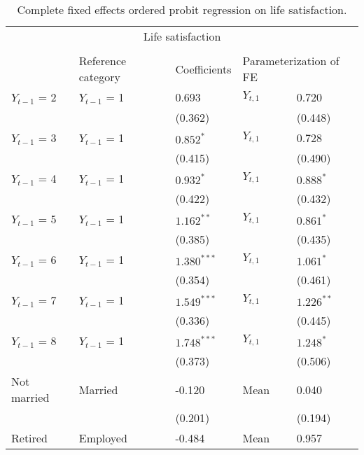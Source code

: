 \documentclass[12pt]{article}
\begin{document}
\begin{table}[h!]
\centering
\footnotesize
\caption*{Complete fixed effects ordered probit regression on life satisfaction. }
\label{table1}
\begin{tabular}{ll l l l}
\hline
\multicolumn{5}{c}{Life satisfaction} \\\\
 & \multicolumn{1}{l}{Reference category} & \multicolumn{1}{l}{Coefficients} & \multicolumn{2}{l}{Parameterization of FE}\\\hline\hline
$Y_{t-1}$ = 2               & $Y_{t-1}$ = 1 &  0.693         & $Y_{t,1}$ &  0.720\\
                            &               &  (0.362)       &           &  (0.448)\\
$Y_{t-1}$ = 3               & $Y_{t-1}$ = 1 &  $0.852^{*}$   & $Y_{t,1}$ &  0.728\\
                            &               &  (0.415)       &           &  (0.490)\\
$Y_{t-1}$ = 4               & $Y_{t-1}$ = 1 &  $0.932^{*}$   & $Y_{t,1}$ &  $0.888^{*}$\\
                            &               &  (0.422)       &           &  (0.432)\\
$Y_{t-1}$ = 5               & $Y_{t-1}$ = 1 &  $1.162^{**}$  & $Y_{t,1}$ &  $0.861^{*}$\\
                            &               &  (0.385)       &           &  (0.435)\\
$Y_{t-1}$ = 6               & $Y_{t-1}$ = 1 &  $1.380^{***}$ & $Y_{t,1}$ &  $1.061^{*}$\\
                            &               &  (0.354)       &           &  (0.461)\\
$Y_{t-1}$ = 7               & $Y_{t-1}$ = 1 &  $1.549^{***}$ & $Y_{t,1}$ &  $1.226^{**}$\\
                            &               &  (0.336)       &           &  (0.445)\\
$Y_{t-1}$ = 8               & $Y_{t-1}$ = 1 &  $1.748^{***}$ & $Y_{t,1}$ &  $1.248^{*}$\\
                            &               &  (0.373)       &           &  (0.506)\\
Not married                 & Married       & -0.120         & Mean      &  0.040\\
                            &               &  (0.201)       &           &  (0.194)\\
Retired                     & Employed      & -0.484         & Mean      &  0.957\\

\end{tabular}
\end{table}
\end{document}
